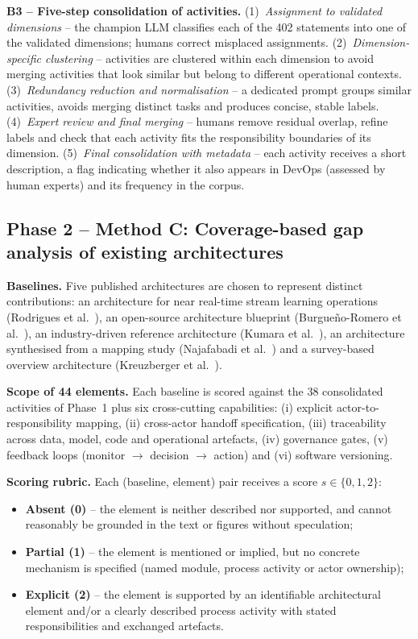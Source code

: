 \documentclass[11pt,a4paper]{article}
\begin{document}
\textbf{B3 -- Five-step consolidation of activities.}
(1)~\emph{Assignment to validated dimensions} -- the champion LLM classifies each of the 402 statements into one of the validated dimensions; humans correct misplaced assignments.
(2)~\emph{Dimension-specific clustering} -- activities are clustered within each dimension to avoid merging activities that look similar but belong to different operational contexts.
(3)~\emph{Redundancy reduction and normalisation} -- a dedicated prompt groups similar activities, avoids merging distinct tasks and produces concise, stable labels.
(4)~\emph{Expert review and final merging} -- humans remove residual overlap, refine labels and check that each activity fits the responsibility boundaries of its dimension.
(5)~\emph{Final consolidation with metadata} -- each activity receives a short description, a flag indicating whether it also appears in DevOps (assessed by human experts) and its frequency in the corpus.

\subsection{Phase 2 -- Method C: Coverage-based gap analysis of existing architectures}

\textbf{Baselines.}
Five published architectures are chosen to represent distinct contributions: an architecture for near real-time stream learning operations (Rodrigues et al.~\cite{rodrigues2025}), an open-source architecture blueprint (Burgue\~no-Romero et al.~\cite{burgueno2025}), an industry-driven reference architecture (Kumara et al.~\cite{kumara2025}), an architecture synthesised from a mapping study (Najafabadi et al.~\cite{najafabadi2024}) and a survey-based overview architecture (Kreuzberger et al.~\cite{kreuzberger2023}).

\textbf{Scope of 44 elements.}
Each baseline is scored against the 38 consolidated activities of Phase~1 plus six cross-cutting capabilities: (i) explicit actor-to-responsibility mapping, (ii) cross-actor handoff specification, (iii) traceability across data, model, code and operational artefacts, (iv) governance gates, (v) feedback loops (monitor $\rightarrow$ decision $\rightarrow$ action) and (vi) software versioning.

\textbf{Scoring rubric.}
Each (baseline, element) pair receives a score $s \in \{0, 1, 2\}$:
\begin{itemize}
  \item \textbf{Absent (0)} -- the element is neither described nor supported, and cannot reasonably be grounded in the text or figures without speculation;
  \item \textbf{Partial (1)} -- the element is mentioned or implied, but no concrete mechanism is specified (named module, process activity or actor ownership);
  \item \textbf{Explicit (2)} -- the element is supported by an identifiable architectural element and/or a clearly described process activity with stated responsibilities and exchanged artefacts.
\end{itemize}
\end{document}
